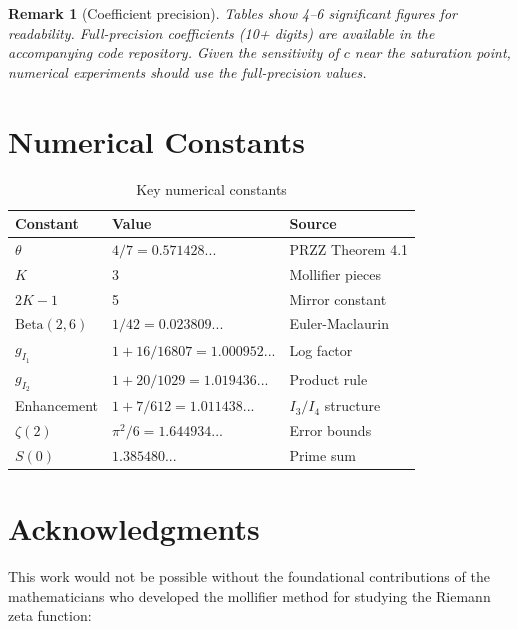 \documentclass[11pt]{article}
\newtheorem{remark}{Remark}
\begin{document}
\begin{remark}[Coefficient precision]
Tables show 4--6 significant figures for readability. Full-precision coefficients (10+ digits) are available in the accompanying code repository. Given the sensitivity of $c$ near the saturation point, numerical experiments should use the full-precision values.
\end{remark}

\section{Numerical Constants}
\label{app:constants}

\begin{table}[h]
\centering
\caption{Key numerical constants}
\begin{tabular}{lll}
\toprule
Constant & Value & Source \\
\midrule
$\theta$ & $4/7 = 0.571428...$ & PRZZ Theorem 4.1 \\
$K$ & 3 & Mollifier pieces \\
$2K-1$ & 5 & Mirror constant \\
$\text{Beta}(2,6)$ & $1/42 = 0.023809...$ & Euler-Maclaurin \\
$g_{I_1}$ & $1 + 16/16807 = 1.000952...$ & Log factor \\
$g_{I_2}$ & $1 + 20/1029 = 1.019436...$ & Product rule \\
Enhancement & $1 + 7/612 = 1.011438...$ & $I_3/I_4$ structure \\
$\zeta(2)$ & $\pi^2/6 = 1.644934...$ & Error bounds \\
$S(0)$ & $1.385480...$ & Prime sum \\
\bottomrule
\end{tabular}
\end{table}

\section{Acknowledgments}
\label{app:acknowledgments}

This work would not be possible without the foundational contributions of the mathematicians who developed the mollifier method for studying the Riemann zeta function:
\end{document}
